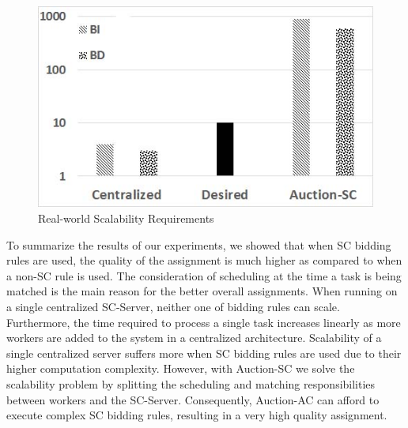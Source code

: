\begin{figure}[h]
	\centering
	\includegraphics[scale=0.25]{figures/scale_req.jpg}
	\vspace{-0.1in}
	\caption{Real-world Scalability Requirements}\label{fig:req}
\end{figure}

To summarize the results of our experiments, we showed that when SC bidding rules are used, the quality of the assignment is much higher as compared to when a non-SC rule is used. The consideration of scheduling at the time a task is being matched is the main reason for the better overall assignments. When running on a single centralized SC-Server, neither one of bidding rules can scale. Furthermore, the time required to process a single task increases linearly as more workers are added to the system in a centralized architecture. Scalability of a single centralized server suffers more when SC bidding rules are used due to their higher computation complexity. However, with Auction-SC we solve the scalability problem by splitting the scheduling and matching responsibilities between workers and the SC-Server. Consequently, Auction-AC can afford to execute complex SC bidding rules, resulting in a very high quality assignment. %

